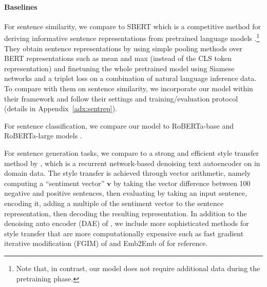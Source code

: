 \paragraph{Baselines}
For sentence similarity, we compare to SBERT which is a competitive method for deriving informative sentence representations from pretrained language models \cite{Reimers2019SentenceBERT}.\footnote{Note that, in contrast, our model does not require additional data during the pretraining phase. } They obtain sentence representations by using simple pooling methods over BERT representations such as mean and max (instead of the CLS token representation) and finetuning the whole pretrained model using Siamese networks and a triplet loss on a combination of natural language inference data.  To compare with them on sentence similarity, we incorporate our model within their framework and follow their settings and training/evaluation protocol (details in Appendix~\ref{adx:sentrep}). 

For sentence classification, we compare our model to RoBERTa-base and RoBERTa-large models \cite{liu2019RoBERTa}.  %

For sentence generation tasks, we compare to a strong and efficient style transfer method by \citet{shen2019educating}, which is a recurrent network-based denoising text autoencoder on in domain data. The style transfer is achieved  through vector arithmetic, namely computing a “sentiment vector” $\mathbf{v}$ by taking the vector difference between 100 negative and positive sentences, then evaluating by taking an input sentence, encoding it, adding a multiple of the sentiment vector to the sentence representation, then decoding the resulting representation. In addition to the denoising auto encoder (DAE) of \citet{shen2019educating}, we include more sophisticated methods for style transfer that are more computationally expensive such as fast gradient iterative modification (FGIM) of \citet{wang2019controllable} and Emb2Emb of \citet{mai2020plug} for reference.
 

